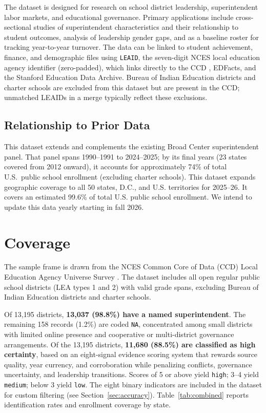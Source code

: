 \documentclass[12pt]{article}
\begin{document}
The dataset is designed for research on school district leadership, superintendent labor markets, and educational governance. Primary applications include cross-sectional studies of superintendent characteristics and their relationship to student outcomes, analysis of leadership gender gaps, and as a baseline roster for tracking year-to-year turnover. The data can be linked to student achievement, finance, and demographic files using \texttt{LEAID}, the seven-digit NCES local education agency identifier (zero-padded), which links directly to the CCD \citep{nces_ccd}, EDFacts, and the Stanford Education Data Archive. Bureau of Indian Education districts and charter schools are excluded from this dataset but are present in the CCD; unmatched LEAIDs in a merge typically reflect these exclusions.

\subsection{Relationship to Prior Data}

This dataset extends and complements the existing Broad Center superintendent panel. That panel spans 1990--1991 to 2024--2025; by its final years (23 states covered from 2012 onward), it accounts for approximately 74\% of total U.S.\ public school enrollment (excluding charter schools). This dataset expands geographic coverage to all 50 states, D.C., and U.S. territories for 2025--26. It covers an estimated 99.6\% of total U.S. public school enrollment. We intend to update this data yearly starting in fall 2026.

\section{Coverage}

The sample frame is drawn from the NCES Common Core of Data (CCD) Local Education Agency Universe Survey \citep{nces_ccd}. The dataset includes all open regular public school districts (LEA types 1 and 2) with valid grade spans, excluding Bureau of Indian Education districts and charter schools.

Of 13,195 districts, \textbf{13,037 (98.8\%) have a named superintendent}. The remaining 158 records (1.2\%) are coded \texttt{NA}, concentrated among small districts with limited online presence and cooperative or multi-district governance arrangements. Of the 13,195 districts, \textbf{11,680 (88.5\%) are classified as high certainty}, based on an eight-signal evidence scoring system that rewards source quality, year currency, and corroboration while penalizing conflicts, governance uncertainty, and leadership transitions. Scores of 5 or above yield \texttt{high}; 3--4 yield \texttt{medium}; below 3 yield \texttt{low}. The eight binary indicators are included in the dataset for custom filtering (see Section~\ref{sec:accuracy}). Table~\ref{tab:combined} reports identification rates and enrollment coverage by state.
\end{document}
